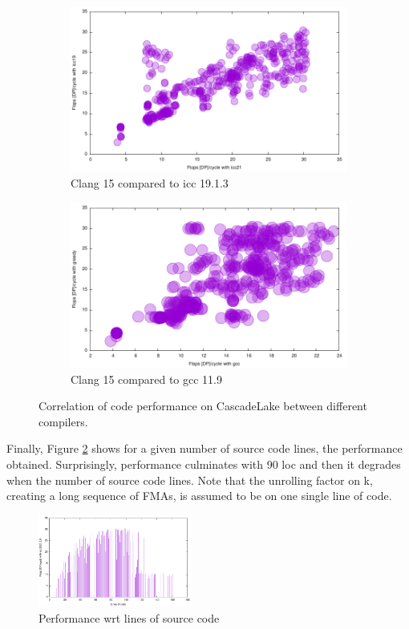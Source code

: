 \documentclass[sigconf,review]{acmart}
\begin{document}
\begin{figure}[ht]
  \begin{subfigure}[h]{0.45\textwidth}
  \includegraphics[width=\textwidth]{../benches/gemm/cascadelake-64x256x64/icc21xicc19.pdf}
  \caption{Clang 15 compared to icc 19.1.3}
  \end{subfigure}
  \begin{subfigure}[h]{0.45\textwidth}  
\includegraphics[width=\textwidth]{../benches/gemm/cascadelake-64x256x64/gccxgreedy.pdf}
  \caption{Clang 15 compared to gcc 11.9}
  \end{subfigure}
  \caption{Correlation of code performance on CascadeLake between different compilers.\label{fig:cascadelakecorrelation}}
\end{figure}

Finally, Figure \ref{fig:cascadelakeloc} shows for a given number of
source code lines, the performance obtained. Surprisingly, performance
culminates with 90 loc and then it degrades when the number of source
code lines. Note that the unrolling factor on k, creating a long
sequence of FMAs, is assumed to be on one single line of code.
\begin{figure}[ht]
  \includegraphics[width=0.45\textwidth]{../benches/gemm/cascadelake-64x256x64/icc21loc.pdf}
  \caption{Performance wrt lines of source code\label{fig:cascadelakeloc}}
\end{figure}
\end{document}
